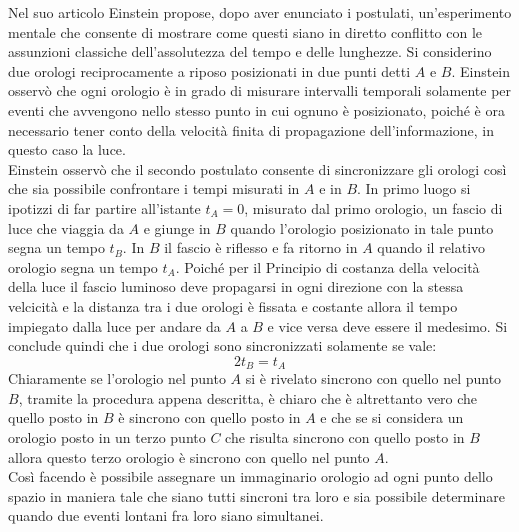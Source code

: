 Nel suo articolo Einstein propose, dopo aver enunciato i postulati, un'esperimento mentale che consente di mostrare come questi siano in diretto conflitto con 
le assunzioni classiche dell'assolutezza del tempo e delle lunghezze. Si considerino due orologi reciprocamente a riposo posizionati in due punti detti $A$ e $B$.
Einstein osservò che ogni orologio è in grado di misurare intervalli temporali solamente per eventi che avvengono nello stesso punto in cui ognuno è posizionato, poiché è ora necessario 
tener conto della velocità finita di propagazione dell'informazione, in questo caso la luce.\\ Einstein osservò che il secondo postulato consente di 
sincronizzare gli orologi così che sia possibile confrontare i tempi misurati in $A$ e in $B$. In primo luogo si ipotizzi di far partire 
all'istante $t_A=0$, misurato dal primo orologio, un fascio di luce che viaggia da $A$ e giunge in $B$ quando l'orologio posizionato in tale punto segna un tempo $t_B$.
In $B$ il fascio è riflesso e fa ritorno in $A$ quando il relativo orologio segna un tempo $t_A$. Poiché per il Principio di costanza della velocità della luce il fascio 
luminoso deve propagarsi in ogni direzione con la stessa velcicità e la distanza tra i due orologi è fissata e costante allora il tempo impiegato dalla luce per andare da 
$A$ a $B$ e vice versa deve essere il medesimo. Si conclude quindi che i due orologi sono sincronizzati solamente se vale:
\begin{equation}
    2t_B=t_A
    \label{SinconizazioneOrologi}
\end{equation}
Chiaramente se l'orologio nel punto $A$ si è rivelato sincrono con quello nel punto $B$, tramite la procedura appena descritta, è chiaro che è altrettanto vero che quello posto in $B$ è sincrono 
con quello posto in $A$ e che se si considera un orologio posto in un terzo punto $C$ che risulta sincrono con quello posto in $B$ allora questo terzo orologio è sincrono con quello nel punto $A$.\\
Così facendo è possibile assegnare un immaginario orologio ad ogni punto dello spazio in maniera tale che siano tutti sincroni tra loro e sia possibile determinare quando due eventi lontani fra loro siano simultanei.\\

